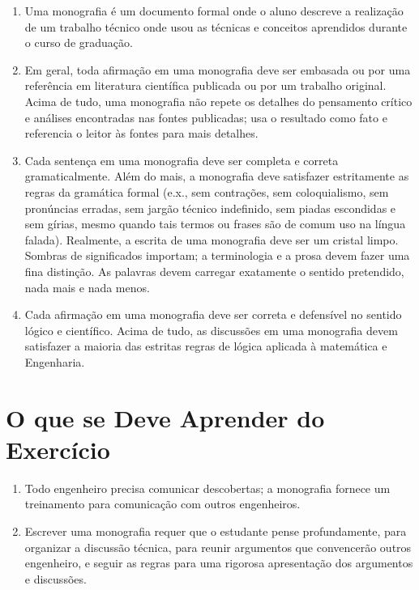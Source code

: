 \begin{enumerate}
	
	\item Uma monografia é um documento formal onde o aluno descreve a realização de um trabalho técnico onde usou as técnicas e conceitos aprendidos durante o curso de 	graduação.

	\item Em geral, toda afirmação em uma monografia deve ser embasada ou por uma referência em literatura científica publicada ou por um trabalho original.
	Acima de tudo, uma monografia não repete os detalhes do pensamento crítico e análises encontradas nas fontes publicadas; usa o resultado como fato e 
	referencia o leitor às fontes para mais detalhes. 

	\item Cada sentença em uma monografia deve ser completa e correta gramaticalmente. Além do mais, a monografia deve satisfazer estritamente as 
	regras da gramática formal (e.x., sem contrações, sem coloquialismo, sem pronúncias erradas, sem jargão técnico indefinido, sem piadas escondidas e sem gírias,
	mesmo quando tais termos ou frases são de comum uso na língua falada). Realmente, a escrita de uma monografia deve ser um cristal limpo.
	Sombras de significados importam; a terminologia e a prosa devem fazer uma fina distinção. As palavras devem carregar exatamente o sentido pretendido, nada mais e nada 	menos.

	\item Cada afirmação em uma monografia deve ser correta e defensível no sentido lógico e científico. Acima de tudo, as discussões em uma monografia devem satisfazer
	a maioria das estritas regras de lógica aplicada à matemática e Engenharia.                       

\end{enumerate}

\section{O que se Deve Aprender do Exercício}

\begin{enumerate}

	\item Todo engenheiro precisa comunicar descobertas; a monografia fornece um treinamento para comunicação com outros engenheiros.

	\item Escrever uma monografia requer que o estudante pense profundamente, para organizar a discussão técnica, para reunir argumentos que convencerão outros engenheiro,
	e seguir as regras para uma rigorosa apresentação dos argumentos e discussões.

\end{enumerate}

